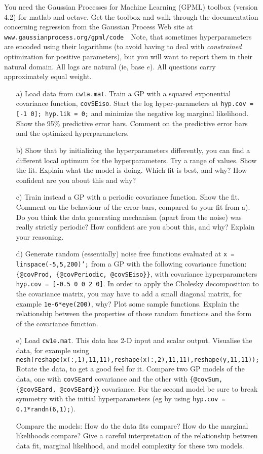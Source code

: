 \documentclass[11pt]{article}
\begin{document}
You need the Gaussian Processes for Machine Learning (GPML) toolbox
(version 4.2) for matlab and octave. Get the toolbox and walk through
the documentation concerning regression from the Gaussian Process Web
site at \texttt{www.gaussianprocess.org/gpml/code}\ \ Note, that
sometimes hyperparameters are encoded using their logarithms (to avoid
having to deal with \emph{constrained} optimization for positive
parameters), but you will want to report them in their natural
domain. All logs are natural (ie, base $e$). All questions carry
approximately equal weight.
%
\begin{enumerate}

\item[a)] Load data from \texttt{cw1a.mat}. Train a GP with a
  squared exponential covariance function, \texttt{covSEiso}. Start
  the log hyper-parameters at \texttt{hyp.cov = [-1 0]; hyp.lik = 0;} and
  minimize the negative log marginal likelihood. Show the 95\%
  predictive error bars. Comment on the predictive error bars and the
  optimized hyperparameters.

\item[b)] Show that by initializing the hyperparameters
  differently, you can find a different local optimum for the
  hyperparameters. Try a range of values. Show the fit. Explain what
  the model is doing. Which fit is best, and why? How confident are
  you about this and why?

\item[c)] Train instead a GP with a periodic covariance
  function. Show the fit. Comment on the behaviour of the error-bars,
  compared to your fit from a). Do you think the data generating
  mechanism (apart from the noise) was really strictly periodic? How
  confident are you about this, and why?  Explain your reasoning.

\item[d)] Generate random (essentially) noise free functions evaluated
  at \texttt{x = linspace(-5,5,200)';} from a GP with the following
  covariance function: \texttt{\{@covProd, \{@covPeriodic,
    @covSEiso\}\}}, with covariance hyperparameters \texttt{hyp.cov =
    [-0.5 0 0 2 0]}. In order to apply the Cholesky decomposition to
  the covariance matrix, you may have to add a small diagonal matrix,
  for example \texttt{1e-6*eye(200)}, why?  Plot some sample
  functions. Explain the relationship between the properties of those
  random functions and the form of the covariance function.

\item[e)] Load \texttt{cw1e.mat}. This data has 2-D input and
  scalar output. Visualise the data, for example using
  \texttt{mesh(reshape(x(:,1),11,11),reshape(x(:,2),11,11),reshape(y,11,11));}
  Rotate the data, to get a good feel for it. Compare two GP models of
  the data, one with \texttt{covSEard} covariance and the other with 
  \texttt{\{@covSum, \{@covSEard, @covSEard\}\}} covariance. For the
  second model be sure to break symmetry with the initial
  hyperparameters (eg by using \texttt{hyp.cov =
    0.1*randn(6,1);}). 

  Compare the models: How do the data fits compare? How do the
  marginal likelihoods compare? Give a careful interpretation of the
  relationship between data fit, marginal likelihood, and model
  complexity for these two models.

\end{enumerate}
\end{document}
